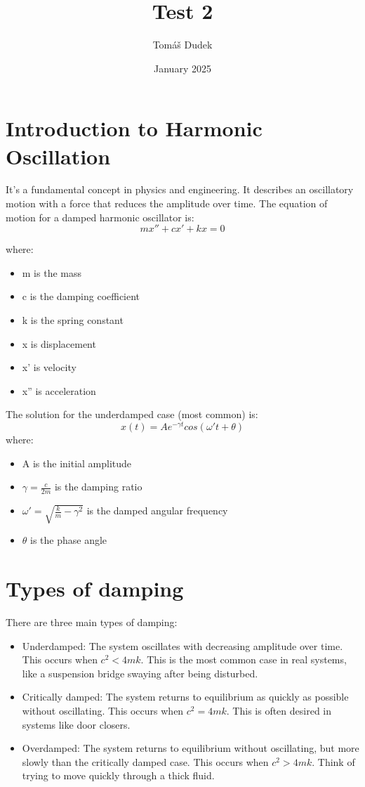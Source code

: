 \documentclass{article}
\title{Test 2}
\author{Tomáš Dudek}
\date{January 2025}
\begin{document}
\maketitle

\section{Introduction to Harmonic Oscillation}
It's a fundamental concept in physics and engineering. It describes an oscillatory motion with a force that reduces the amplitude over time.
The equation of motion for a damped harmonic oscillator is:
\[mx'' + cx' + kx = 0\]

where:
\begin{itemize}
    \item m is the mass
    \item c is the damping coefficient
    \item k is the spring constant
    \item x is displacement
    \item x' is velocity
    \item x'' is acceleration
\end{itemize}

The solution for the underdamped case (most common) is:
\[x(t) = Ae^{-{\gamma}t}cos(\omega't + \theta)\]
where:

\begin{itemize}
    \item A is the initial amplitude
    \item $\gamma = \frac{c}{2m}$ is the damping ratio
    \item $\omega' = \sqrt{\frac{k}{m} - {\gamma}^2}$ is the damped angular frequency
    \item $\theta$ is the phase angle
\end{itemize}

\section{Types of damping}
There are three main types of damping:

\begin{itemize}
    \item Underdamped: The system oscillates with decreasing amplitude over time. This occurs when $c^2 < 4mk$. This is the most common case in real systems, like a suspension bridge swaying after being disturbed.
    \item Critically damped: The system returns to equilibrium as quickly as possible without oscillating. This occurs when $c^2 = 4mk$. This is often desired in systems like door closers.
    \item Overdamped: The system returns to equilibrium without oscillating, but more slowly than the critically damped case. This occurs when $c^2 > 4mk$. Think of trying to move quickly through a thick fluid.
\end{itemize}
\end{document}
